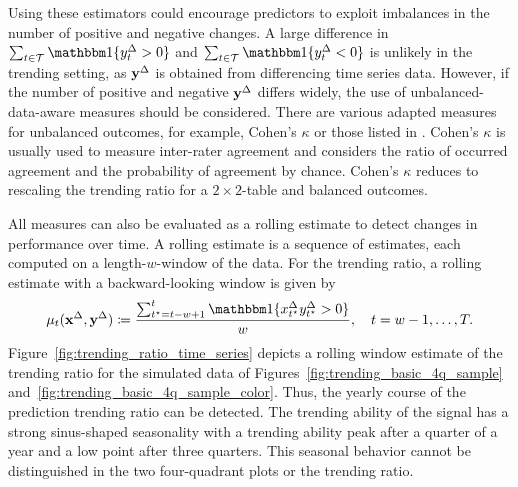 Using these estimators could encourage predictors to exploit imbalances in the number of positive and negative changes. 
A large difference in $\sum_{t \in \mathcal{T}} \ind{\diffyt > 0}$ and $\sum_{t \in \mathcal{T}} \ind{\diffyt < 0}$ is unlikely in the trending setting, as $\mathbf{y}^{\Delta}$ is obtained from differencing time series data. 
However, if the number of positive and negative $\mathbf{y}^{\Delta}$ differs widely, the use of unbalanced-data-aware measures should be considered.
There are various adapted measures for unbalanced outcomes, for example, Cohen's $\kappa$ \parencite{Cohen1960} or those listed in \textcite[Table 3.3]{Jolliffe2012}.
Cohen's $\kappa$ is usually used to measure inter-rater agreement and considers the ratio of occurred agreement and the probability of agreement by chance.
Cohen's $\kappa$ reduces to rescaling the trending ratio for a $2\times2$-table and balanced outcomes.

All measures can also be evaluated as a rolling estimate to detect changes in performance over time.
A rolling estimate is a sequence of estimates, each computed on a length-$w$-window of the data.
For the trending ratio, a rolling estimate with a backward-looking window is given by
\begin{equation*}
    \acc_t (\diffx, \diffy) \coloneqq \frac{\sum_{t^\star = t-w + 1}^{t} \ind{\diffxt[t^\star] \diffyt[t^\star] > 0}}{w}, \quad t = w-1, \dots, T.\label{eq:acc_rolling}
\end{equation*}
Figure~\ref{fig:trending_ratio_time_series} depicts a rolling window estimate of the trending ratio for the simulated data of Figures~\ref{fig:trending_basic_4q_sample} and~\ref{fig:trending_basic_4q_sample_color}.
Thus, the yearly course of the prediction trending ratio can be detected.
The trending ability of the signal has a strong sinus-shaped seasonality with a trending ability peak after a quarter of a year and a low point after three quarters.
This seasonal behavior cannot be distinguished in the two four-quadrant plots or the trending ratio.


